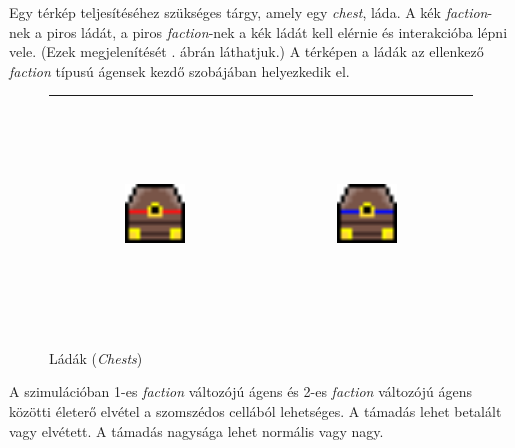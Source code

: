
Egy térkép teljesítéséhez szükséges tárgy, amely egy \textit{chest}, láda. A kék \textit{faction}-nek a piros ládát, a piros \textit{faction}-nek a kék ládát kell elérnie és interakcióba lépni vele. (Ezek megjelenítését . ábrán láthatjuk.)
A térképen a ládák az ellenkező \textit{faction} típusú ágensek kezdő szobájában helyezkedik el.

\begin{figure}[h!]
    \begin{center}
        \begin{tabular}{ | c | c | }
            \hline
            \includegraphics[width=0.3\textwidth, height=60mm]{images/chest_0.png}
            & 
            \includegraphics[width=0.3\textwidth, height=60mm]{images/chest_1.png}    
            \\
            \hline
        \end{tabular}
        \caption{Ládák (\textit{Chests})}
        \label{tbl:Chests}
    \end{center}
\end{figure}


A szimulációban 1-es \textit{faction} változójú ágens és 2-es \textit{faction} változójú ágens közötti életerő elvétel a szomszédos cellából lehetséges. A támadás lehet betalált vagy elvétett. A támadás nagysága lehet normális vagy nagy.

